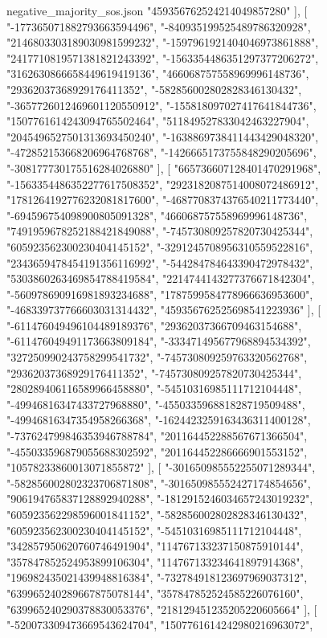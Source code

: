 \begin{filecontents*}[overwrite]{negative_majority_sos.json}
    "459356762524214049857280"
   ],
   [
    "-177365071882793663594496",
    "-840935199525489786320928",
    "2146803303189030981599232",
    "-1597961921404046973861888",
    "2417710819571381821243392",
    "-1563354486351297377206272",
    "3162630866658449619419136",
    "466068757558969996148736",
    "29362037368929176411352",
    "-582856002802828346130432",
    "-3657726012469601120550912",
    "-155818097027417641844736",
    "1507761614243094765502464",
    "511849527833042463227904",
    "2045496527501313693450240",
    "-1638869738411443429048320",
    "-472852153668206964768768",
    "-1426665173755848290205696",
    "-308177730175516284026880"
   ],
   [
    "665736607128401470291968",
    "-1563354486352277617508352",
    "2923182087514008072486912",
    "1781264192776232081817600",
    "-4687708374376540211773440",
    "-694596754098900805091328",
    "466068757558969996148736",
    "7491959678252188421849088",
    "-745730809257820730425344",
    "605923562300230404145152",
    "-3291245708956310559522816",
    "2343659478454191356116992",
    "-544284784643390472978432",
    "5303860263469854788419584",
    "2214744143277376671842304",
    "-560978690916981893234688",
    "1787599584778966636953600",
    "-468339737766603031314432",
    "459356762525698541223936"
   ],
   [
    "-611476049496104489189376",
    "29362037366709463154688",
    "-611476049491173663809184",
    "-333471495677968894534392",
    "327250990243758299541732",
    "-745730809259763320562768",
    "29362037368929176411352",
    "-745730809257820730425344",
    "280289406116589966458880",
    "-54510316985111712104448",
    "-49946816347433727968880",
    "-455033596881828719509488",
    "-49946816347354958266368",
    "-1624423259163436311400128",
    "-737624799846353946788784",
    "201164452288567671366504",
    "-455033596879055688302592",
    "201164452286666901553152",
    "10578233860013071855872"
   ],
   [
    "-301650985552255071289344",
    "-582856002802323706871808",
    "-301650985552427174854656",
    "906194765837128892940288",
    "-1812915246034657243019232",
    "605923562298596001841152",
    "-582856002802828346130432",
    "605923562300230404145152",
    "-54510316985111712104448",
    "342857950620760746491904",
    "114767133237150875910144",
    "357847852524953899106304",
    "114767133234641897914368",
    "196982435021439948816384",
    "-732784918123697969037312",
    "639965240289667875078144",
    "357847852524585226076160",
    "639965240290378830053376",
    "218129451235205220605664"
   ],
   [
    "-520073309473669543624704",
    "1507761614242980216963072",

\end{filecontents*}
